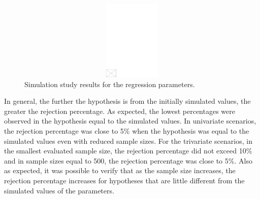 \documentclass[AMA,STIX1COL]{WileyNJD-v2}
\begin{document}
\begin{figure}[h]
\centerline{\includegraphics[width=342pt,height=9pc,draft]{empty}}
\caption{Simulation study results for the regression parameters.\label{fig2}}
\end{figure}

In general, the further the hypothesis is from the initially simulated values, the greater the rejection percentage. As expected, the lowest percentages were observed in the hypothesis equal to the simulated values. In univariate scenarios, the rejection percentage was close to 5\% when the hypothesis was equal to the simulated values even with reduced sample sizes. For the trivariate scenarios, in the smallest evaluated sample size, the rejection percentage did not exceed 10\% and in sample sizes equal to 500, the rejection percentage was close to 5\%. Also as expected, it was possible to verify that as the sample size increases, the rejection percentage increases for hypotheses that are little different from the simulated values of the parameters.
\end{document}

